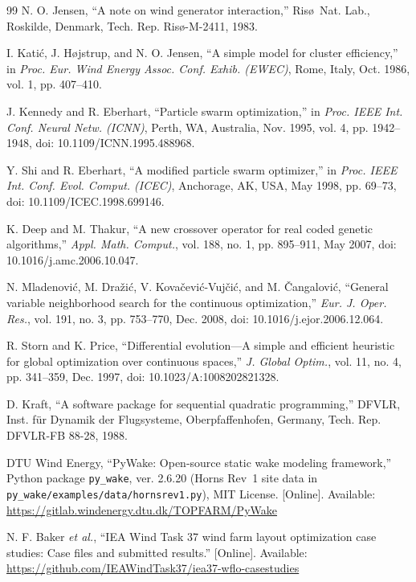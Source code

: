 \documentclass[journal,twoside]{IEEEtran}
\begin{document}
\begin{thebibliography}{99}
N. O. Jensen, ``A note on wind generator interaction,'' Ris\o\ Nat. Lab., Roskilde, Denmark, Tech. Rep. Ris\o-M-2411, 1983.

I. Kati\'c, J. H\o jstrup, and N. O. Jensen, ``A simple model for cluster efficiency,'' in \textit{Proc. Eur. Wind Energy Assoc. Conf. Exhib. (EWEC)}, Rome, Italy, Oct. 1986, vol. 1, pp. 407--410.

J. Kennedy and R. Eberhart, ``Particle swarm optimization,'' in \textit{Proc. IEEE Int. Conf. Neural Netw. (ICNN)}, Perth, WA, Australia, Nov. 1995, vol. 4, pp. 1942--1948, doi: 10.1109/ICNN.1995.488968.

Y. Shi and R. Eberhart, ``A modified particle swarm optimizer,'' in \textit{Proc. IEEE Int. Conf. Evol. Comput. (ICEC)}, Anchorage, AK, USA, May 1998, pp. 69--73, doi: 10.1109/ICEC.1998.699146.

K. Deep and M. Thakur, ``A new crossover operator for real coded genetic algorithms,'' \textit{Appl. Math. Comput.}, vol. 188, no. 1, pp. 895--911, May 2007, doi: 10.1016/j.amc.2006.10.047.

N. Mladenovi\'c, M. Dra\v{z}i\'c, V. Kova\v{c}evi\'c-Vuj\v{c}i\'c, and M. \v{C}angalovi\'c, ``General variable neighborhood search for the continuous optimization,'' \textit{Eur. J. Oper. Res.}, vol. 191, no. 3, pp. 753--770, Dec. 2008, doi: 10.1016/j.ejor.2006.12.064.

R. Storn and K. Price, ``Differential evolution---A simple and efficient heuristic for global optimization over continuous spaces,'' \textit{J. Global Optim.}, vol. 11, no. 4, pp. 341--359, Dec. 1997, doi: 10.1023/A:1008202821328.

D. Kraft, ``A software package for sequential quadratic programming,'' DFVLR, Inst. f\"ur Dynamik der Flugsysteme, Oberpfaffenhofen, Germany, Tech. Rep. DFVLR-FB 88-28, 1988.

DTU Wind Energy, ``PyWake: Open-source static wake modeling framework,'' Python package \texttt{py\_wake}, ver. 2.6.20 (Horns Rev~1 site data in \texttt{py\_wake/examples/data/hornsrev1.py}), MIT License. [Online]. Available: \url{https://gitlab.windenergy.dtu.dk/TOPFARM/PyWake}

N. F. Baker \textit{et al.}, ``IEA Wind Task 37 wind farm layout optimization case studies: Case files and submitted results.'' [Online]. Available: \url{https://github.com/IEAWindTask37/iea37-wflo-casestudies}


\end{thebibliography}
\end{document}
